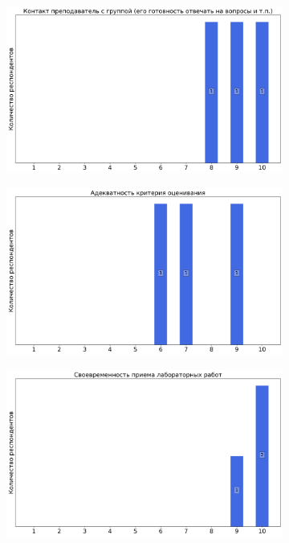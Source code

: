         \begin{figure}[H]
            \centering
            \begin{subfigure}[b]{0.45\textwidth}
                \centering
                \includegraphics[width=\textwidth]{images/1 course/Общая физика - механика/labniks-marks-Веревочкин Ю.Г.-0.png}
            \end{subfigure}
            \begin{subfigure}[b]{0.45\textwidth}
                \centering
                \includegraphics[width=\textwidth]{images/1 course/Общая физика - механика/labniks-marks-Веревочкин Ю.Г.-1.png}
            \end{subfigure}
            \begin{subfigure}[b]{0.45\textwidth}
                \centering
                \includegraphics[width=\textwidth]{images/1 course/Общая физика - механика/labniks-marks-Веревочкин Ю.Г.-2.png}

\end{subfigure}
\end{figure}
